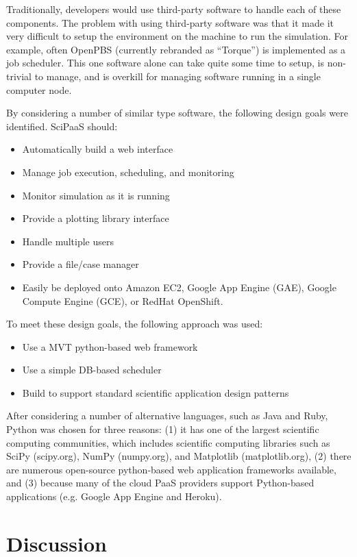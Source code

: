 \documentclass[10pt,reprint]{socc14}
\begin{document}
Traditionally, developers would use third-party software to handle each of these components.  The problem with using third-party software was that it made it very difficult to setup the environment on the machine to run the simulation.  For example, often OpenPBS (currently rebranded as “Torque”) is implemented as a job scheduler.  This one software alone can take quite some time to setup, is non-trivial to manage, and is overkill for managing software running in a single computer node.

By considering a number of similar type software, the following design goals were identified.  SciPaaS should:

\begin{itemize}
\item Automatically build a web interface
\item Manage job execution, scheduling, and monitoring
\item Monitor simulation as it is running
\item Provide a plotting library interface
\item Handle multiple users
\item Provide a file/case manager
\item Easily be deployed onto Amazon EC2, Google App Engine (GAE), Google Compute Engine (GCE), or RedHat OpenShift.
\end{itemize}

To meet these design goals, the following approach was used:

\begin{itemize}
\item Use a MVT python-based web framework
\item Use a simple DB-based scheduler
\item Build to support standard scientific application design patterns
\end{itemize}

After considering a number of alternative languages, such as Java and Ruby, Python was chosen for three reasons: (1) it has one of the largest scientific computing communities, which includes scientific computing libraries such as SciPy (scipy.org), NumPy (numpy.org), and Matplotlib (matplotlib.org), (2) there are numerous open-source python-based web application frameworks available, and (3) because many of the cloud PaaS providers support Python-based applications (e.g. Google App Engine and Heroku).

\section{Discussion}
\end{document}
